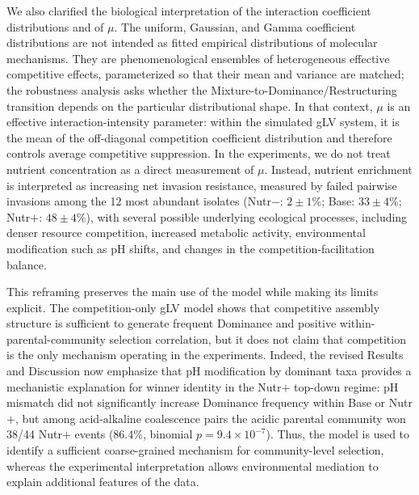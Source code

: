 We also clarified the biological interpretation of the interaction coefficient distributions and of $\mu$. The uniform, Gaussian, and Gamma coefficient distributions are not intended as fitted empirical distributions of molecular mechanisms. They are phenomenological ensembles of heterogeneous effective competitive effects, parameterized so that their mean and variance are matched; the robustness analysis asks whether the Mixture-to-Dominance/Restructuring transition depends on the particular distributional shape. In that context, $\mu$ is an effective interaction-intensity parameter: within the simulated gLV system, it is the mean of the off-diagonal competition coefficient distribution and therefore controls average competitive suppression. In the experiments, we do not treat nutrient concentration as a direct measurement of $\mu$. Instead, nutrient enrichment is interpreted as increasing net invasion resistance, measured by failed pairwise invasions among the 12 most abundant isolates (Nutr$-$: $2 \pm 1\%$; Base: $33 \pm 4\%$; Nutr$+$: $48 \pm 4\%$), with several possible underlying ecological processes, including denser resource competition, increased metabolic activity, environmental modification such as pH shifts, and changes in the competition-facilitation balance.

This reframing preserves the main use of the model while making its limits explicit. The competition-only gLV model shows that competitive assembly structure is sufficient to generate frequent Dominance and positive within-parental-community selection correlation, but it does not claim that competition is the only mechanism operating in the experiments. Indeed, the revised Results and Discussion now emphasize that pH modification by dominant taxa provides a mechanistic explanation for winner identity in the Nutr$+$ top-down regime: pH mismatch did not significantly increase Dominance frequency within Base or Nutr$+$, but among acid-alkaline coalescence pairs the acidic parental community won 38/44 Nutr$+$ events (86.4\%, binomial $p = 9.4 \times 10^{-7}$). Thus, the model is used to identify a sufficient coarse-grained mechanism for community-level selection, whereas the experimental interpretation allows environmental mediation to explain additional features of the data.

